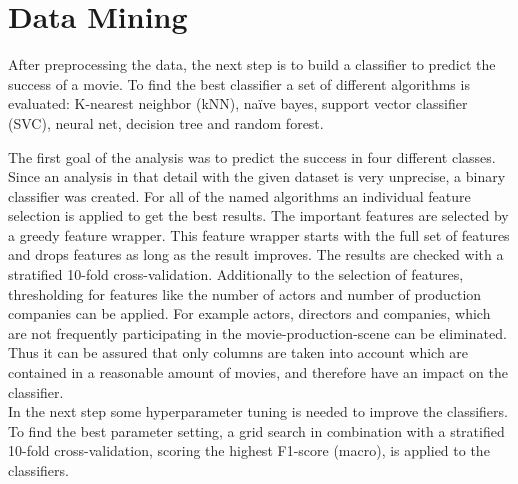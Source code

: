\begingroup
\renewcommand{\clearpage}{}
\chapter{Data Mining}\label{cha:data_mining}
\endgroup

After preprocessing the data, the next step is to build a classifier to predict the success of a movie. To find the best classifier a set of different algorithms is evaluated:
K-nearest neighbor (kNN), 
na\"{i}ve bayes, 
support vector classifier (SVC), 
neural net, 
decision tree and 
random forest.

The first goal of the analysis was to predict the success in four different classes. Since an analysis in that detail with the given dataset is very unprecise, a binary classifier was created.
For all of the named algorithms an individual feature selection is applied to get the best results. The important features are selected by a greedy feature wrapper. This feature wrapper starts with the full set of features and drops features as long as the result improves. The results are checked with a stratified 10-fold cross-validation. Additionally to the selection of features, thresholding for features like the number of actors and number of production companies can be applied. For example actors, directors and companies, which are not frequently participating in the movie-production-scene can be eliminated. Thus it can be assured that only columns are taken into account which are contained in a reasonable amount of movies, and therefore have an impact on the classifier. \\
In the next step some hyperparameter tuning is needed to improve the classifiers. To find the best parameter setting, a grid search in combination with a stratified 10-fold cross-validation, scoring the highest F1-score (macro), is applied to the classifiers.

